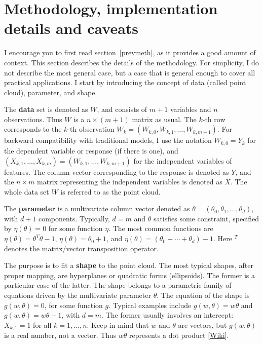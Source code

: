 \documentclass[oneside,10pt]{book}
\begin{document}
  
\section{Methodology, implementation details and caveats}

I encourage you to first read section~\ref{prevmeth}, as it provides a good amount of context. This section describes the details of the methodology. 
For simplicity, I do not describe the most general case, but a case that is general enough to cover all practical applications. I start by introducing the concept of data (called point cloud), parameter, and shape.

The {\bf data} set is denoted 
 as $W$, and consists of $m+1$ variables and $n$ observations. Thus $W$ is a $n \times (m+1)$ matrix as usual. The $k$-th row 
 corresponds to the $k$-th observation $W_k=(W_{k,0},W_{k,1},\dots,W_{k, m+1})$. For backward compatibility with traditional models, I use the notation $W_{k,0}=Y_k$ for the dependent variable or response (if there is one), and $(X_{k,1},\dots,X_{k,m})=(W_{k,1},\dots,W_{k, m+1})$ for
 the independent variables of features. The column vector corresponding to the response is denoted as $Y$, and the $n\times m$ matrix 
 representing the independent variables is denoted as $X$. The whole data set $W$ is referred to as the point cloud. 

The {\bf parameter} is a multivariate
 column vector denoted as $\theta=(\theta_0,\theta_1,\dots,\theta_d)$, with $d+1$ components. Typically, $d=m$ and $\theta$ satisfies some  constraint, specified by $\eta(\theta)=0$
 for some function $\eta$. The most common functions are $\eta(\theta)=\theta^T\theta-1$, $\eta(\theta)=\theta_0+1$, and
  $\eta(\theta)=(\theta_0+\cdots + \theta_d) - 1$. Here $^T$ denotes the matrix/vector transposition operator.

The purpose is to fit a {\bf shape} to the point cloud. The most typical shapes, after proper mapping, are hyperplanes or quadratic forms (ellipsoids). The
 former is a particular case of the latter. The shape belongs to a parametric family of equations driven by the multivariate parameter $\theta$. The equation of the shape is $g(w,\theta)=0$, for some function $g$. Typical examples include $g(w,\theta)=w\theta$ and $g(w,\theta)=w\theta-1$, with $d=m$. 
The former usually involves an intercept: $X_{k,1}=1$ for all $k=1,\dots,n$. Keep in mind that $w$ and $\theta$ are vectors, but $g(w,\theta)$ is a real number, not a vector. Thus $w\theta$ represents a \textcolor{index}{dot product} [\href{https://en.wikipedia.org/wiki/Dot_product}{Wiki}]. 
\end{document}
